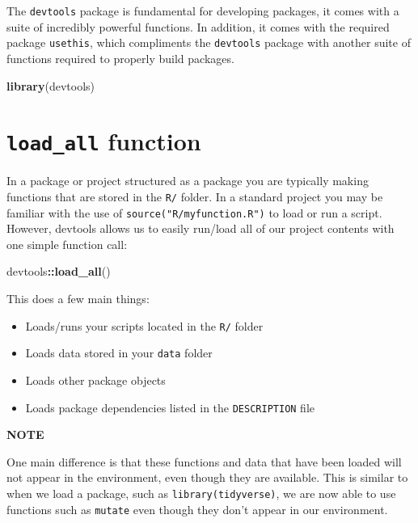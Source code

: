 \documentclass[
]{book}
\newenvironment{Shaded}{\begin{snugshade}}{\end{snugshade}}
\newcommand{\KeywordTok}[1]{\textcolor[rgb]{0.13,0.29,0.53}{\textbf{#1}}}
\newcommand{\NormalTok}[1]{#1}
\newcommand{\OperatorTok}[1]{\textcolor[rgb]{0.81,0.36,0.00}{\textbf{#1}}}
\providecommand{\tightlist}{%
  \setlength{\itemsep}{0pt}\setlength{\parskip}{0pt}}
\begin{document}
The \texttt{devtools} package is fundamental for developing packages, it comes with a suite of incredibly powerful functions. In addition,
it comes with the required package \texttt{usethis}, which compliments the \texttt{devtools} package with another suite of functions required to properly build packages.

\begin{Shaded}
\begin{Highlighting}[]
\KeywordTok{library}\NormalTok{(devtools)}
\end{Highlighting}
\end{Shaded}

\hypertarget{load}{%
\section{\texorpdfstring{\texttt{load\_all} function}{load\_all function}}\label{load}}

In a package or project structured as a package you are typically making functions that are stored in the \texttt{R/} folder. In a standard project you may be familiar with the use of \texttt{source("R/myfunction.R")} to load or run a script. However, devtools allows us to easily run/load all of our project contents with one simple function call:

\begin{Shaded}
\begin{Highlighting}[]
\NormalTok{devtools}\OperatorTok{::}\KeywordTok{load_all}\NormalTok{()}
\end{Highlighting}
\end{Shaded}

This does a few main things:

\begin{itemize}
\tightlist
\item
  Loads/runs your scripts located in the \texttt{R/} folder\\
\item
  Loads data stored in your \texttt{data} folder\\
\item
  Loads other package objects\\
\item
  Loads package dependencies listed in the \texttt{DESCRIPTION} file
\end{itemize}

\textbf{NOTE}

One main difference is that these functions and data that have been loaded will not appear in the environment, even though they are available. This is similar to when we load a package, such as \texttt{library(tidyverse)}, we are now able to use functions such as \texttt{mutate} even though they don't appear in our environment.
\end{document}
